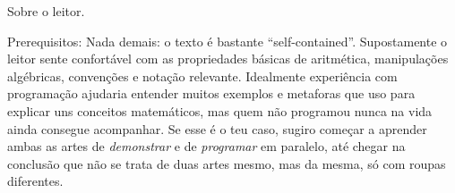 \endsecblah

\secblah Sobre o leitor.

\blah Prerequisitos:
Nada demais: o texto é bastante ``self-contained''.
Supostamente o leitor sente confortável com as propriedades básicas
de aritmética, manipulações algébricas, convenções e notação relevante.
Idealmente experiência com programação ajudaria entender muitos exemplos
e metaforas que uso para explicar uns conceitos matemáticos, mas quem
não programou nunca na vida ainda consegue acompanhar.
Se esse é o teu caso, sugiro começar a aprender ambas as artes de
\emph{demonstrar} e de \emph{programar} em paralelo, até chegar
na conclusão que não se trata de duas artes mesmo, mas da mesma,
só com roupas diferentes.

\endsecblah

\endchapblah

